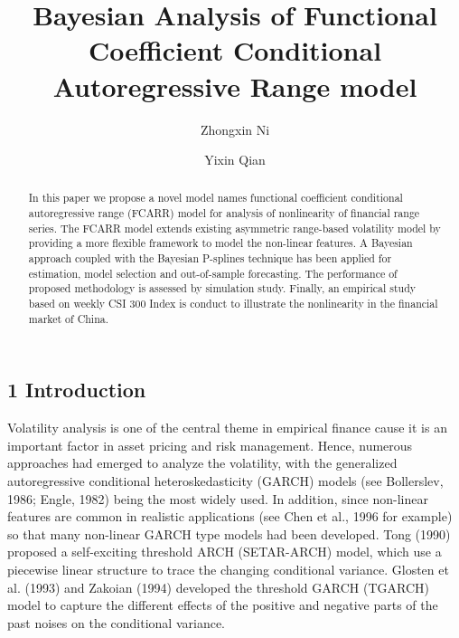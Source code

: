 \documentclass[
journal=jacsat, %
manuscript=article]{achemso}
\author{Zhongxin Ni}
\affiliation[Shanghai University]{School of Economics, Shanghai University, Shanghai}
\author{Yixin Qian}
\affiliation[Shanghai University]{School of Economics, Shanghai University, Shanghai}
\title[\texttt{achemso} demonstration]
{Bayesian Analysis of Functional Coefficient Conditional Autoregressive Range model}
\begin{document}
\begin{CJK*}{UTF8}{song}
\begin{abstract}
In this paper we propose a novel model names functional coefficient conditional autoregressive range (FCARR) model for analysis of nonlinearity of financial range series. The FCARR model extends existing asymmetric range-based volatility model by providing a more flexible framework to model the non-linear features. A Bayesian approach coupled with the Bayesian P-splines technique has been applied for estimation, model selection and out-of-sample forecasting. The performance of proposed methodology is assessed by simulation study. Finally, an empirical study based on weekly CSI 300 Index is conduct to illustrate the nonlinearity in the financial market of China.
\end{abstract}


\section{1 Introduction}

Volatility analysis is one of the central theme in empirical finance cause it is an important factor in asset pricing and risk management. Hence, numerous approaches had emerged to analyze the volatility, with the generalized autoregressive conditional heteroskedasticity (GARCH) models (see Bollerslev, 1986; Engle, 1982) being the most widely used. In addition, since non-linear features are common in realistic applications (see Chen et al., 1996 for example) so that many non-linear GARCH type models had been developed. Tong (1990) proposed a self-exciting threshold ARCH (SETAR-ARCH) model, which use a piecewise linear structure to trace the changing conditional variance. Glosten et al. (1993) and Zakoian (1994) developed the threshold GARCH (TGARCH) model to capture the different effects of the positive and negative parts of the past noises on the conditional variance.


\end{CJK*}
\end{document}
